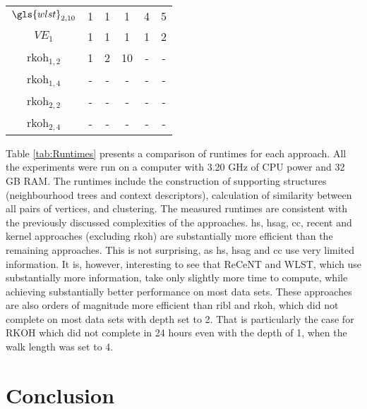\begin{table}
\begin{center}
\begin{tabular}[htb]{@{}cccccc@{}}
		$\gls{wlst}_{2,10}$	&	1		&	1	   &  	1	  &		4	   &   	5		\\

		$VE_1$			&	1		&	1	   &  	1	  &		1	   &   	2		\\

		\gls{rkoh}$_{1,2}$	&	1		&	2	   &  	10	  &	-		   &   -			\\

		\gls{rkoh}$_{1,4}$	&	-		&	-	   &  - 	  &  -	   &  - 		\\

		\gls{rkoh}$_{2,2}$	&	-		&	-	   &  - 	  &  -	   &  - 		\\

		\gls{rkoh}$_{2,4}$	&	-		&	-	   &  - 	  &  -	   &  - 		\\
		\bottomrule
		\end{tabular}

	\end{center}

\end{table}

Table \ref{tab:Runtimes} presents a comparison of runtimes for each approach.
All the experiments were run on a computer with 3.20 GHz of CPU power and 32 GB RAM.
The runtimes include the construction of supporting structures (neighbourhood trees and context descriptors), calculation of similarity between all pairs of vertices, and clustering.
The measured runtimes are consistent with the previously discussed complexities of the approaches.
\gls{hs}, \gls{hsag}, \gls{cc}, \gls{recent} and kernel approaches (excluding \gls{rkoh}) are substantially more efficient than the remaining approaches.
This is not surprising, as \gls{hs}, \gls{hsag} and \gls{cc}  use very limited information.
It is, however, interesting to see that ReCeNT and WLST,  which use substantially more information, take only slightly more time to compute, while achieving substantially better performance on most data sets.
These approaches are also orders of magnitude more efficient than \gls{ribl} and \gls{rkoh}, which did not complete on most data sets with depth set to 2.
That is particularly the case for RKOH which did not complete in 24 hours even with the depth of 1, when the walk length was set to 4.







\section{Conclusion}


